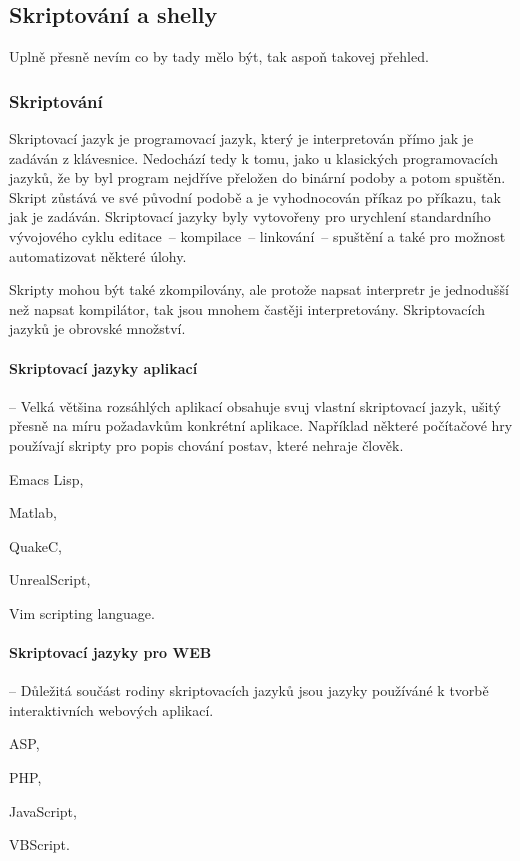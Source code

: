 \subsection{Skriptování a shelly}

Uplně přesně nevím co by tady mělo být, tak aspoň takovej přehled.

\subsubsection*{Skriptování}

Skriptovací jazyk je programovací jazyk, který je interpretován přímo jak je
zadáván z klávesnice. Nedochází tedy k tomu, jako u klasických programovacích
jazyků, že by byl program nejdříve přeložen do binární podoby a potom spuštěn.
Skript zůstává ve své původní podobě a je vyhodnocován příkaz po příkazu, tak
jak je zadáván. Skriptovací jazyky byly vytovořeny pro urychlení standardního
vývojového cyklu editace~-- kompilace~-- linkování~-- spuštění a také pro
možnost automatizovat některé úlohy.

Skripty mohou být také zkompilovány, ale protože napsat interpretr je jednodušší
než napsat kompilátor, tak jsou mnohem častěji interpretovány. Skriptovacích
jazyků je obrovské množství.

\paragraph{Skriptovací jazyky aplikací} -- Velká většina rozsáhlých aplikací
obsahuje svuj vlastní skriptovací jazyk, ušitý přesně na míru požadavkům
konkrétní aplikace. Například některé počítačové hry používají skripty pro popis
chování postav, které nehraje člověk.
\begin{pitemize}
\item Emacs Lisp,
\item Matlab,
\item QuakeC,
\item UnrealScript,
\item Vim scripting language.
\end{pitemize}

\paragraph{Skriptovací jazyky pro WEB} -- Důležitá součást rodiny skriptovacích
jazyků jsou jazyky používáné k tvorbě interaktivních webových aplikací.
\begin{pitemize}
\item ASP,
\item PHP,
\item JavaScript,
\item VBScript.
\end{pitemize}

